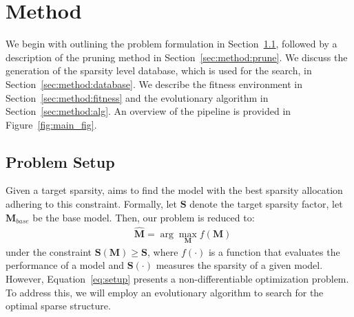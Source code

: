 \vspace{-1em}
\section{Method}

We begin with outlining the problem formulation in Section~\ref{sec:method:setup}, followed by a description of the pruning method in Section~\ref{sec:method:prune}. We discuss the generation of the sparsity level database, which is used for the search, in Section~\ref{sec:method:database}. We describe the fitness environment in Section~\ref{sec:method:fitness} and the evolutionary algorithm in Section~\ref{sec:method:alg}. An overview of the pipeline is provided in Figure~\ref{fig:main_fig}.
\vspace{-1em}
\subsection{Problem Setup}
\label{sec:method:setup}
Given a target sparsity, \sysname aims to find the model with the best sparsity allocation adhering to this constraint. Formally, let $\bm S$ denote the target sparsity factor, let $\bm M_{base}$ be the base model. Then, our problem is reduced to: 
\begin{align}
\label{eq:setup}
    &\hat{\bm M} = \arg \max_{\bm M} f(\bm M)
\end{align}
under the constraint $\bm S(\bm M) \geq \bm S$, where $f(\cdot)$ is a function that evaluates the performance of a model and $\bm S(\cdot)$ measures the sparsity of a given model. However, Equation~\ref{eq:setup} presents a non-differentiable optimization problem. To address this, we will employ an evolutionary algorithm to search for the optimal sparse structure.

\vspace{-1em}
